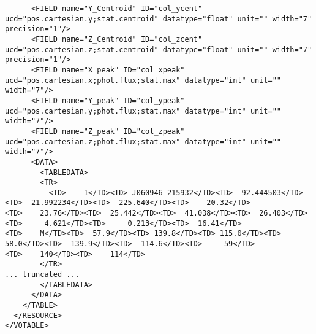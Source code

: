 {\begin{verbatim}
      <FIELD name="Y_Centroid" ID="col_ycent" ucd="pos.cartesian.y;stat.centroid" datatype="float" unit="" width="7" precision="1"/>
      <FIELD name="Z_Centroid" ID="col_zcent" ucd="pos.cartesian.z;stat.centroid" datatype="float" unit="" width="7" precision="1"/>
      <FIELD name="X_peak" ID="col_xpeak" ucd="pos.cartesian.x;phot.flux;stat.max" datatype="int" unit="" width="7"/>
      <FIELD name="Y_peak" ID="col_ypeak" ucd="pos.cartesian.y;phot.flux;stat.max" datatype="int" unit="" width="7"/>
      <FIELD name="Z_peak" ID="col_zpeak" ucd="pos.cartesian.z;phot.flux;stat.max" datatype="int" unit="" width="7"/>
      <DATA>
        <TABLEDATA>
        <TR>
          <TD>    1</TD><TD> J060946-215932</TD><TD>  92.444503</TD><TD> -21.992234</TD><TD>  225.640</TD><TD>    20.32</TD>
<TD>    23.76</TD><TD>  25.442</TD><TD>  41.038</TD><TD>  26.403</TD><TD>     4.621</TD><TD>     0.213</TD><TD>  16.41</TD>
<TD>    M</TD><TD>  57.9</TD><TD> 139.8</TD><TD> 115.0</TD><TD>   58.0</TD><TD>  139.9</TD><TD>  114.6</TD><TD>     59</TD>
<TD>    140</TD><TD>    114</TD>
        </TR>
... truncated ...
        </TABLEDATA>
      </DATA>
    </TABLE>
  </RESOURCE>
</VOTABLE>
  \end{verbatim}
}

